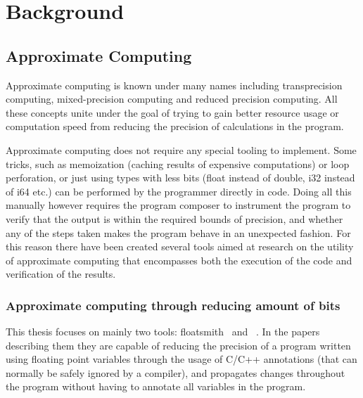 \section{Background} 

\subsection{Approximate Computing}
Approximate computing is known under many names including transprecision computing, mixed-precision computing and reduced precision computing.
All these concepts unite under the goal of trying to gain better resource usage or computation speed from reducing the precision of calculations in the program. 

Approximate computing does not require any special tooling to implement. Some tricks, such as memoization (caching results of expensive computations) or loop perforation, or just using types with less bits (float instead of double, i32 instead of i64 etc.) can be performed by the programmer directly in code. Doing all this manually however requires the program composer to instrument the program to verify that the output is within the required bounds of precision, and whether any of the steps taken makes the program behave in an unexpected fashion. For this reason there have been created several tools aimed at research on the utility of approximate computing that encompasses both the execution of the code and verification of the results. 

\subsubsection{Approximate computing through reducing amount of bits}
\label{section:approximate_computing_through_reducing_bits}

This thesis focuses on mainly two tools: floatsmith~\citep{floatsmith_paper} and \taffo{}~\citep{cherubin2019taffo}. In the papers describing them they are capable of reducing the precision of a program written using floating point variables through the usage of C/C++ annotations (that can normally be safely ignored by a compiler), and propagates changes throughout the program without having to annotate all variables in the program.

